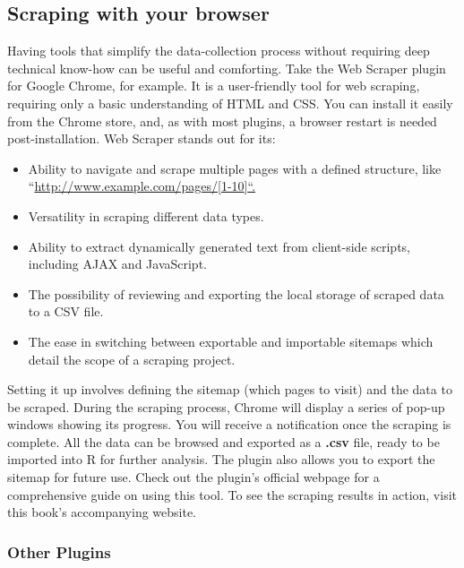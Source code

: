 \subsection{Scraping with your
browser}\label{scraping-with-your-browser}

Having tools that simplify the data-collection process without requiring
deep technical know-how can be useful and comforting. Take the Web
Scraper plugin for Google Chrome, for example. It is a user-friendly
tool for web scraping, requiring only a basic understanding of HTML and
CSS. You can install it easily from the Chrome store, and, as with most
plugins, a browser restart is needed post-installation. Web Scraper stands out for its:

\begin{itemize}
\tightlist
\item
  Ability to navigate and scrape multiple pages with a defined
  structure, like
  ``\href{http://www.example.com/pages/\%5B1-10\%5D\%22.}{http://www.example.com/pages/{[}1-10{]}``.}\\
\item
  Versatility in scraping different data types.\\
\item
  Ability to extract dynamically generated text from client-side
  scripts, including AJAX and JavaScript.\\
\item
  The possibility of reviewing and exporting the local storage of scraped data to a
  CSV file.\\
\item
  The ease in switching between exportable and importable sitemaps
  which detail the scope of a scraping project.
\end{itemize}

Setting it up involves defining the sitemap (which pages to visit) and the
data to be scraped. During the scraping process, Chrome will display a
series of pop-up windows showing its progress. You will receive a
notification once the scraping is complete. All the data can be
browsed and exported as a \textbf{.csv} file, ready to be imported into
R for further analysis. The plugin also allows you to export the sitemap for
future use. Check out the plugin's official webpage for a comprehensive
guide on using this tool. To see the scraping results in action, visit this
book's accompanying website.

\subsubsection{Other Plugins}\label{other-plugins}


